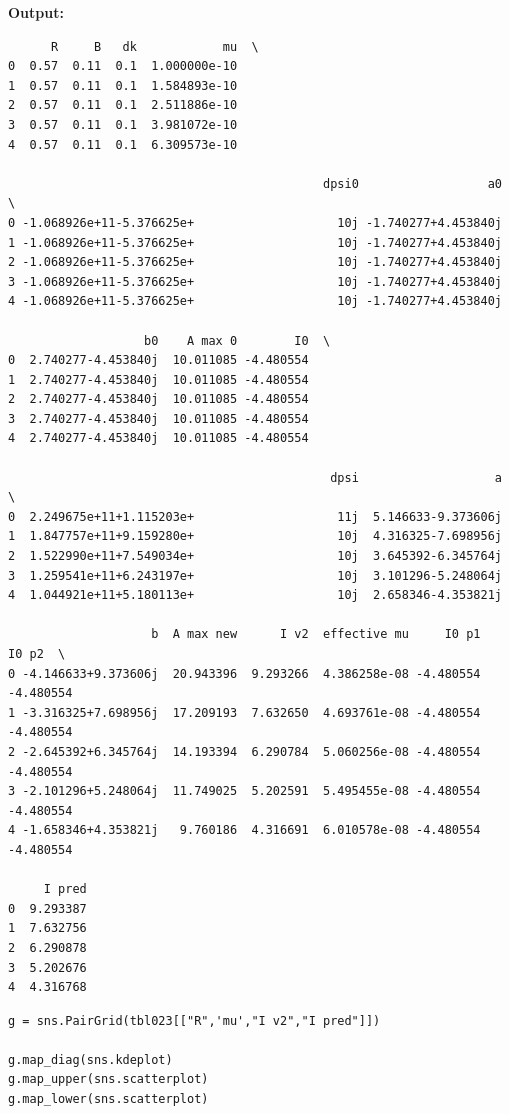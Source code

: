 \documentclass{article}
\begin{document}
\textbf{Output:}\begin{verbatim}
      R     B   dk            mu  \
0  0.57  0.11  0.1  1.000000e-10   
1  0.57  0.11  0.1  1.584893e-10   
2  0.57  0.11  0.1  2.511886e-10   
3  0.57  0.11  0.1  3.981072e-10   
4  0.57  0.11  0.1  6.309573e-10   

                                            dpsi0                  a0  \
0 -1.068926e+11-5.376625e+                    10j -1.740277+4.453840j   
1 -1.068926e+11-5.376625e+                    10j -1.740277+4.453840j   
2 -1.068926e+11-5.376625e+                    10j -1.740277+4.453840j   
3 -1.068926e+11-5.376625e+                    10j -1.740277+4.453840j   
4 -1.068926e+11-5.376625e+                    10j -1.740277+4.453840j   

                   b0    A max 0        I0  \
0  2.740277-4.453840j  10.011085 -4.480554   
1  2.740277-4.453840j  10.011085 -4.480554   
2  2.740277-4.453840j  10.011085 -4.480554   
3  2.740277-4.453840j  10.011085 -4.480554   
4  2.740277-4.453840j  10.011085 -4.480554   

                                             dpsi                   a  \
0  2.249675e+11+1.115203e+                    11j  5.146633-9.373606j   
1  1.847757e+11+9.159280e+                    10j  4.316325-7.698956j   
2  1.522990e+11+7.549034e+                    10j  3.645392-6.345764j   
3  1.259541e+11+6.243197e+                    10j  3.101296-5.248064j   
4  1.044921e+11+5.180113e+                    10j  2.658346-4.353821j   

                    b  A max new      I v2  effective mu     I0 p1     I0 p2  \
0 -4.146633+9.373606j  20.943396  9.293266  4.386258e-08 -4.480554 -4.480554   
1 -3.316325+7.698956j  17.209193  7.632650  4.693761e-08 -4.480554 -4.480554   
2 -2.645392+6.345764j  14.193394  6.290784  5.060256e-08 -4.480554 -4.480554   
3 -2.101296+5.248064j  11.749025  5.202591  5.495455e-08 -4.480554 -4.480554   
4 -1.658346+4.353821j   9.760186  4.316691  6.010578e-08 -4.480554 -4.480554   

     I pred  
0  9.293387  
1  7.632756  
2  6.290878  
3  5.202676  
4  4.316768  
\end{verbatim}

\begin{lstlisting}
g = sns.PairGrid(tbl023[["R",'mu',"I v2","I pred"]])

g.map_diag(sns.kdeplot)
g.map_upper(sns.scatterplot)
g.map_lower(sns.scatterplot)\end{lstlisting}
\end{document}
